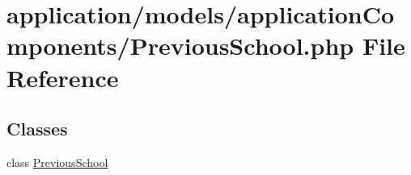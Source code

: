 \hypertarget{_previous_school_8php}{\section{application/models/application\-Components/\-Previous\-School.php File Reference}
\label{_previous_school_8php}
}
\subsection*{Classes}
\begin{DoxyCompactItemize}
\item 
class \hyperlink{class_previous_school}{Previous\-School}
\end{DoxyCompactItemize}
